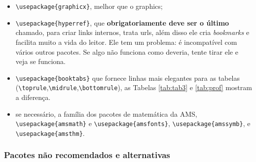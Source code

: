 \documentclass{article}
\begin{document}
\begin{itemize}
    \item \verb!\usepackage{graphicx}!, melhor que o graphics;
    \item \verb!\usepackage{hyperref}!, que \textbf{obrigatoriamente deve ser o último} chamado, para criar links internos, trata urls, além disso ele cria \textit{bookmarks} e facilita muito a vida do leitor. Ele tem um problema: é incompatível com vários outros pacotes. Se algo não funciona como deveria, tente tirar ele e veja se funciona.
    \item \verb!\usepackage{booktabs}! que fornece linhas mais elegantes para as tabelas (\verb!\toprule!,\verb!\midrule!,\verb!\bottomrule!), as Tabelas \ref{tab:tab3} e \ref{tab:prof} mostram a diferença.
    \item se necessário, a família dos pacotes de matemática da AMS, \verb!\usepackage{amsmath}! e
    \verb!\usepackage{amsfonts}!, \verb!\usepackage{amssymb}!, e \verb!\usepackage{amsthm}!.
\end{itemize}

%
%
%

\subsubsection{Pacotes não recomendados e alternativas}
\end{document}
